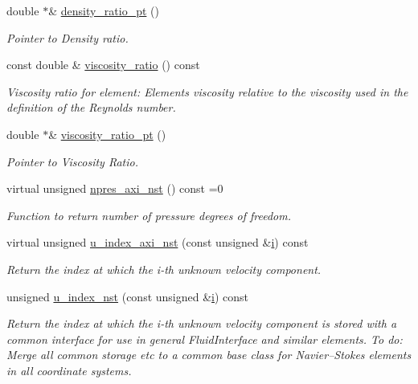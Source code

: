 \begin{DoxyCompactItemize}
double $\ast$\& \hyperlink{classoomph_1_1AxisymmetricNavierStokesEquations_a41b0018805380d1673308198128fc4b7}{density\+\_\+ratio\+\_\+pt} ()
\begin{DoxyCompactList}\small\item\em Pointer to Density ratio. \end{DoxyCompactList}\item 
const double \& \hyperlink{classoomph_1_1AxisymmetricNavierStokesEquations_a4cf2dc737978f76fc7e0ad6358414f88}{viscosity\+\_\+ratio} () const
\begin{DoxyCompactList}\small\item\em Viscosity ratio for element\+: Element\textquotesingle{}s viscosity relative to the viscosity used in the definition of the Reynolds number. \end{DoxyCompactList}\item 
double $\ast$\& \hyperlink{classoomph_1_1AxisymmetricNavierStokesEquations_a50dcf24d5162fa8f5fd8a6efc4df17b7}{viscosity\+\_\+ratio\+\_\+pt} ()
\begin{DoxyCompactList}\small\item\em Pointer to Viscosity Ratio. \end{DoxyCompactList}\item 
virtual unsigned \hyperlink{classoomph_1_1AxisymmetricNavierStokesEquations_a89edaffb4913131cc14a5f6e45ed117a}{npres\+\_\+axi\+\_\+nst} () const =0
\begin{DoxyCompactList}\small\item\em Function to return number of pressure degrees of freedom. \end{DoxyCompactList}\item 
virtual unsigned \hyperlink{classoomph_1_1AxisymmetricNavierStokesEquations_afbdea50fcf4799e2e4e5209ee3249bf0}{u\+\_\+index\+\_\+axi\+\_\+nst} (const unsigned \&\hyperlink{cfortran_8h_adb50e893b86b3e55e751a42eab3cba82}{i}) const
\begin{DoxyCompactList}\small\item\em Return the index at which the i-\/th unknown velocity component. \end{DoxyCompactList}\item 
unsigned \hyperlink{classoomph_1_1AxisymmetricNavierStokesEquations_a14098e563e5329282612425f629eb196}{u\+\_\+index\+\_\+nst} (const unsigned \&\hyperlink{cfortran_8h_adb50e893b86b3e55e751a42eab3cba82}{i}) const
\begin{DoxyCompactList}\small\item\em Return the index at which the i-\/th unknown velocity component is stored with a common interface for use in general Fluid\+Interface and similar elements. To do\+: Merge all common storage etc to a common base class for Navier--Stokes elements in all coordinate systems. \end{DoxyCompactList}\item 

\end{DoxyCompactItemize}
